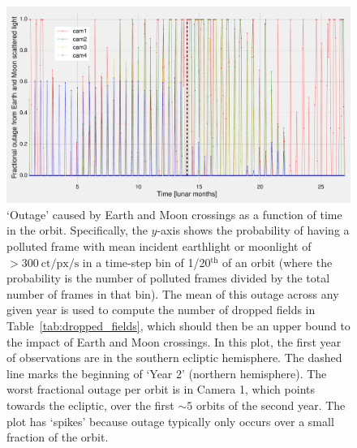 \begin{figure}[!tb]
	\centering
	\includegraphics[angle=90,width=1.05\textwidth]{figures/outage_earth_moon_primary.pdf}
	\caption{`Outage' caused by Earth and Moon crossings as a function of time in the orbit.
	Specifically, the $y$-axis shows the probability of having a polluted frame with mean incident earthlight or moonlight of $>300\ \mathrm{ct/px/s}$ in a time-step bin of 1/20$^\mathrm{th}$ of an orbit (where the probability is the number of polluted frames divided by the total number of frames in that bin).
	The mean of this outage across any given year is used to compute the number of dropped fields in Table~\protect\ref{tab:dropped_fields}, which should then be an upper bound to the impact of Earth and Moon crossings.
	In this plot, the first year of observations are in the southern ecliptic 
	hemisphere. The dashed line marks the beginning of `Year 2' (northern 
	hemisphere). The worst fractional outage per orbit is in Camera 1, which 
	points towards the ecliptic, over the first $\sim\!5$ orbits of the second 
	year.
	The plot has `spikes' because outage typically only occurs over a small fraction of the orbit.}
	\label{fig:earth_moon_primary}
\end{figure}
